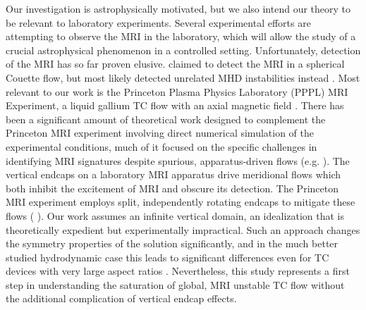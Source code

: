 \documentclass{emulateapj}
\newcommand{\citei}[1]{\citeauthor{#1} \citeyear{#1}}
\begin{document}
Our investigation is astrophysically motivated, but we also intend our theory to be relevant to laboratory experiments. Several experimental efforts are attempting to observe the MRI in the laboratory, which will allow the study of a crucial astrophysical phenomenon in a controlled setting. Unfortunately, detection of the MRI has so far proven elusive. \citei{Sisan:2004ig} claimed to detect the MRI in a spherical Couette flow, but most likely detected unrelated MHD instabilities instead \citep{Hollerbach:2009ig,Gissinger:2011td}. Most relevant to our work is the Princeton Plasma Physics Laboratory (PPPL) MRI Experiment, a liquid gallium TC flow with an axial magnetic field \citep{Ji:2001kd}. There has been a significant amount of theoretical work designed to complement the Princeton MRI experiment involving direct numerical simulation of the experimental conditions, much of it focused on the specific challenges in identifying MRI signatures despite spurious, apparatus-driven flows (e.g. \citei{Gissinger:2012gc}). The vertical endcaps on a laboratory MRI apparatus drive meridional flows which both inhibit the excitement of MRI and obscure its detection. The Princeton MRI experiment employs split, independently rotating endcaps to mitigate these flows (\citei{Schartman:2009df}). Our work assumes an infinite vertical domain, an idealization that is theoretically expedient but experimentally impractical. Such an approach changes the symmetry properties of the solution significantly, and in the much better studied hydrodynamic case this leads to significant differences even for TC devices with very large aspect ratios \citep{Lopez:2005}. Nevertheless, this study represents a first step in understanding the saturation of global, MRI unstable TC flow without the additional complication of vertical endcap effects.
\end{document}
